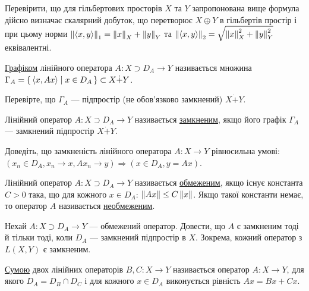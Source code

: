 \begin{exercise}
    Перевірити, що для гільбертових просторів $X$ та $Y$ запропонована вище формула дійсно визначає скалярний добуток,
    що перетворює $X \oplus Y$ в гільбертів простір і при цьому норми $\left\lVert\left\langle x, y\right\rangle\right\rVert_1 = \left\lVert x\right\rVert_X + \left\lVert y\right\rVert_Y$ та
    $\left\lVert\left\langle x, y\right\rangle\right\rVert_2 = \sqrt{\left\lVert x\right\rVert_X^2 + \left\lVert y\right\rVert_Y^2}$ еквівалентні.
\end{exercise}

\begin{theory}
    \ul{Графіком} лінійного оператора $A : X \supset D_A \to Y$ називається множина
    $\Gamma_A = \set{\left\langle x, Ax\right\rangle \mid x \in D_A} \subset X \dot{+} Y$.
\end{theory}

\begin{exercise}
    Перевірте, що $\Gamma_A$ --- підпростір (не обов'язково замкнений) $X \dot{+} Y$.
\end{exercise}

\begin{theory}
    Лінійний оператор $A : X \supset D_A \to Y$ називається \ul{замкненим},
    якщо його графік $\Gamma_A$ --- замкнений підпростір $X \dot{+} Y$.
\end{theory}

\begin{exercise}
    Доведіть, що замкненість лінійного оператора $A : X \to Y$ рівносильна умові:
    $(x_n \in D_A, x_n \to x, A x_n \to y) \Rightarrow (x \in D_A, y = Ax)$.
\end{exercise}

\begin{theory}
    Лінійний оператор $A : X \supset D_A \to Y$ називається \ul{обмеженим}, якщо
    існує константа $C > 0$ така, що для кожного $x \in D_A$: $\left\lVert Ax\right\rVert \leq C \left\lVert x\right\rVert$.
    Якщо такої константи немає, то оператор $A$ називається \ul{необмеженим}.
\end{theory}

\begin{exercise}
    Нехай $A : X \supset D_A \to Y$ --- обмежений оператор. Довести, що $A$ є замкненим
    тоді й тільки тоді, коли $D_A$ --- замкнений підпростір в $X$. Зокрема, кожний оператор з $L(X,Y)$ є замкненим.
\end{exercise}

\begin{theory}
    \ul{Сумою} двох лінійних операторів $B, C : X \to Y$ називається оператор $A : X \to Y$,
    для якого $D_A = D_B \cap D_C$ і для кожного $x \in D_A$ виконується рівність $Ax = Bx + Cx$.
\end{theory}

